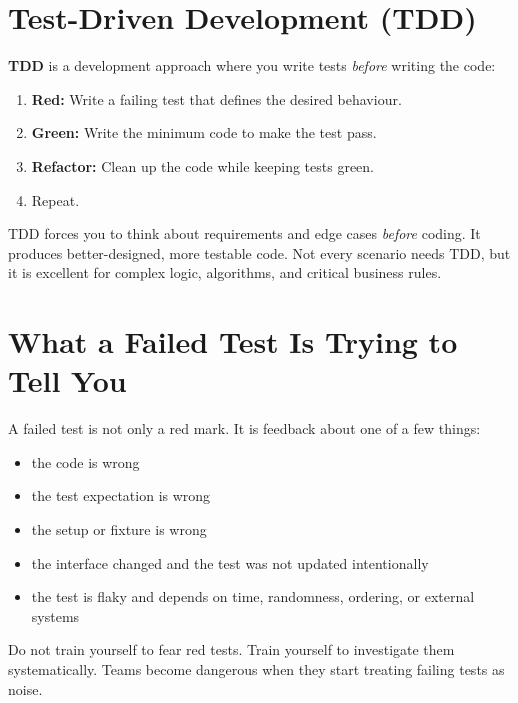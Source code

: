 \documentclass[12pt, a4paper, oneside]{book}
\begin{document}
\section{Test-Driven Development (TDD)}

\textbf{TDD} is a development approach where you write tests \emph{before} writing the code:

\begin{enumerate}[leftmargin=2em]
    \item \textbf{Red:} Write a failing test that defines the desired behaviour.
    \item \textbf{Green:} Write the minimum code to make the test pass.
    \item \textbf{Refactor:} Clean up the code while keeping tests green.
    \item Repeat.
\end{enumerate}

\begin{tipbox}
TDD forces you to think about requirements and edge cases \emph{before} coding. It produces better-designed, more testable code. Not every scenario needs TDD, but it is excellent for complex logic, algorithms, and critical business rules.
\end{tipbox}

\section{What a Failed Test Is Trying to Tell You}

A failed test is not only a red mark. It is feedback about one of a few things:
\begin{itemize}[leftmargin=2em]
    \item the code is wrong
    \item the test expectation is wrong
    \item the setup or fixture is wrong
    \item the interface changed and the test was not updated intentionally
    \item the test is flaky and depends on time, randomness, ordering, or external systems
\end{itemize}

\begin{warningbox}
Do not train yourself to fear red tests. Train yourself to investigate them systematically. Teams become dangerous when they start treating failing tests as noise.
\end{warningbox}
\end{document}
